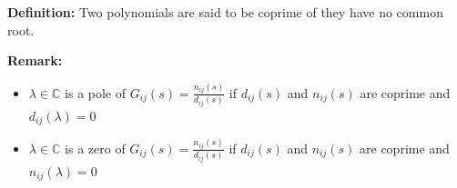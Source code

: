 \documentclass[twoside]{article}
\begin{document}
\vspace{3pt}

\textbf{Definition:} Two polynomials are said to be coprime of they
have no common root. 

\textbf{Remark:} 
\vspace{-6pt}
\begin{itemize}
\item $\lambda \in \mathbb{C}$ is a pole of $G_{ij}(s) =
  \frac{n_{ij}(s)}{d_{ij}(s)}$ if $d_{ij}(s)$ and $n_{ij}(s)$ are
  coprime and $d_{ij}(\lambda)=0$
\\
\item $\lambda \in \mathbb{C}$ is a zero of $G_{ij}(s) =
  \frac{n_{ij}(s)}{d_{ij}(s)}$ if $d_{ij}(s)$ and $n_{ij}(s)$ are
  coprime and $n_{ij}(\lambda)=0$
\
\end{itemize}
\end{document}
